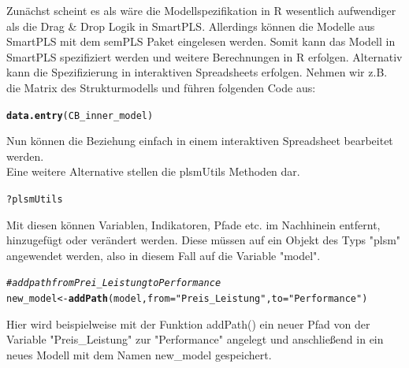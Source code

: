 \documentclass{article}\usepackage[]{graphicx}\usepackage[]{color}
\makeatletter
\newcommand{\hlstr}[1]{\textcolor[rgb]{0.192,0.494,0.8}{#1}}%
\newcommand{\hlcom}[1]{\textcolor[rgb]{0.678,0.584,0.686}{\textit{#1}}}%
\newcommand{\hlopt}[1]{\textcolor[rgb]{0,0,0}{#1}}%
\newcommand{\hlstd}[1]{\textcolor[rgb]{0.345,0.345,0.345}{#1}}%
\newcommand{\hlkwb}[1]{\textcolor[rgb]{0.69,0.353,0.396}{#1}}%
\newcommand{\hlkwc}[1]{\textcolor[rgb]{0.333,0.667,0.333}{#1}}%
\newcommand{\hlkwd}[1]{\textcolor[rgb]{0.737,0.353,0.396}{\textbf{#1}}}%
\newenvironment{kframe}{%
 \def\at@end@of@kframe{}%
 \ifinner\ifhmode%
  \def\at@end@of@kframe{\end{minipage}}%
  \begin{minipage}{\columnwidth}%
 \fi\fi%
 \def\FrameCommand##1{\hskip\@totalleftmargin \hskip-\fboxsep
 \colorbox{shadecolor}{##1}\hskip-\fboxsep
     \hskip-\linewidth \hskip-\@totalleftmargin \hskip\columnwidth}%
 \MakeFramed {\advance\hsize-\width
   \@totalleftmargin\z@ \linewidth\hsize
   \@setminipage}}%
 {\par\unskip\endMakeFramed%
 \at@end@of@kframe}
\newenvironment{knitrout}{}{} %
\makeatother
\begin{document}
Zunächst scheint es als wäre die Modellspezifikation in R wesentlich aufwendiger als die Drag \& Drop Logik in SmartPLS. Allerdings können die Modelle aus SmartPLS mit dem semPLS Paket eingelesen werden. Somit kann das Modell in SmartPLS spezifiziert werden und weitere Berechnungen in R erfolgen. Alternativ kann die Spezifizierung in interaktiven Spreadsheets erfolgen. Nehmen wir z.B. die Matrix des Strukturmodells und führen folgenden Code aus:
\begin{knitrout}
\color{fgcolor}\begin{kframe}
\begin{alltt}
\hlkwd{data.entry}\hlstd{(CB_inner_model)}
\end{alltt}
\end{kframe}
\end{knitrout}
Nun können die Beziehung einfach in einem interaktiven Spreadsheet bearbeitet werden.\\
Eine weitere Alternative stellen die plsmUtils Methoden dar.
\begin{knitrout}
\color{fgcolor}\begin{kframe}
\begin{alltt}
\hlopt{?}\hlstd{plsmUtils}
\end{alltt}
\end{kframe}
\end{knitrout}
Mit diesen können Variablen, Indikatoren, Pfade etc. im Nachhinein entfernt, hinzugefügt oder verändert werden. Diese müssen auf ein Objekt des Typs "plsm" angewendet werden, also in diesem Fall auf die Variable "model".
\begin{knitrout}
\color{fgcolor}\begin{kframe}
\begin{alltt}
\hlcom{#add path from Prei_Leistung to Performance}
\hlstd{new_model} \hlkwb{<-} \hlkwd{addPath}\hlstd{(model,} \hlkwc{from}\hlstd{=}\hlstr{"Preis_Leistung"}\hlstd{,} \hlkwc{to}\hlstd{=}\hlstr{"Performance"}\hlstd{)}
\end{alltt}
\end{kframe}
\end{knitrout}
Hier wird beispielweise mit der Funktion addPath() ein neuer Pfad von der Variable "Preis\_Leistung" zur "Performance" angelegt und anschließend in ein neues Modell mit dem Namen new\_model gespeichert.
\end{document}
